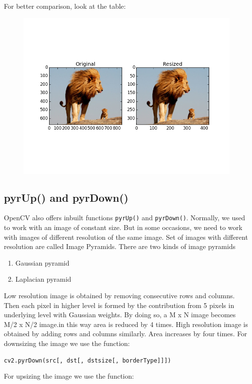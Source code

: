 \documentclass[]{article}
\begin{document}
For better comparison, look at the table:
\begin{figure}
\centering
\includegraphics{resizecomp.png}
\end{figure}
\subsection{pyrUp() and pyrDown()}\label{pyrup-and-pyrdown}

OpenCV also offers inbuilt functions \texttt{pyrUp()} and
\texttt{pyrDown()}. Normally, we used to work with an image of constant size. But in some occasions, we need to work with images of different resolution of the same image. Set of images with different resolution are called Image Pyramids. There are two kinds of image pyramids
\begin{enumerate}
\item Gaussian pyramid
\item Laplacian pyramid
\end{enumerate}

Low resolution image is obtained by removing consecutive rows and
columns. Then each pixel in higher level is formed by the contribution
from 5 pixels in underlying level with Gaussian weights. By doing so, a
M x N image becomes M/2 x N/2 image.in this way area is reduced by 4
times. High resolution image is obtained by adding rows and columns
similarly. Area increases by four times. For downsizing the image we use
the function:

\texttt{cv2.pyrDown(src{[},\ dst{[},\ dstsize{[},\ borderType{]}{]}{]})}

For upsizing the image we use the function:
\end{document}
